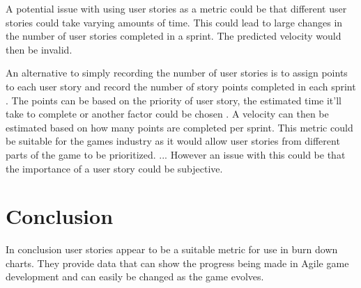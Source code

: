 \documentclass{scrartcl}
\begin{document}
A potential issue with using user stories as a metric could be that different user stories could take varying amounts of time. This could lead to large changes in the number of user stories completed in a sprint. The predicted velocity would then be invalid. 

An alternative to simply recording the number of user stories is to assign points to each user story and record the number of story points completed in each sprint \cite{Downey}. The points can be based on the priority of user story, the estimated time it'll take to complete or another factor could be chosen \cite{Downey}. A velocity can then be estimated based on how many points are completed per sprint.  This metric could be suitable for the games industry as it would allow user stories from different parts of the game to be prioritized. ... However an issue with this could be that the importance of a user story could be subjective. 


\section{Conclusion}
In conclusion user stories appear to be a suitable metric for use in burn down charts. They provide data that can show the progress being made in Agile game development and can easily be changed as the game evolves.


	


	
\end{document}
